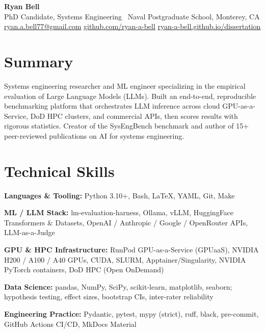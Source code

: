 \documentclass[10pt,letterpaper]{article}
\newcommand{\skillcat}[2]{\textbf{#1:} #2\par}
\begin{document}
\begin{center}
  {\Huge\bfseries\color{npsnavy} Ryan Bell}\\[3pt]
  {\normalsize PhD Candidate, Systems Engineering \textbullet\ Naval Postgraduate School, Monterey, CA}\\[3pt]
  {\small
    \href{mailto:ryan.a.bell77@gmail.com}{ryan.a.bell77@gmail.com} \quad\textbullet\quad
    \href{https://github.com/ryan-a-bell}{github.com/ryan-a-bell} \quad\textbullet\quad
    \href{https://ryan-a-bell.github.io/dissertation/}{ryan-a-bell.github.io/dissertation}
  }
\end{center}

\section{Summary}
Systems engineering researcher and ML engineer specializing in the empirical evaluation of
Large Language Models (LLMs). Built an end-to-end, reproducible benchmarking platform that
orchestrates LLM inference across cloud GPU-as-a-Service, DoD HPC clusters, and commercial
APIs, then scores results with rigorous statistics. Creator of the SysEngBench benchmark and
author of 15+ peer-reviewed publications on AI for systems engineering.

\section{Technical Skills}
\skillcat{Languages \& Tooling}{Python 3.10+, Bash, LaTeX, YAML, Git, Make}
\skillcat{ML / LLM Stack}{lm-evaluation-harness, Ollama, vLLM, HuggingFace Transformers \& Datasets, OpenAI / Anthropic / Google / OpenRouter APIs, LLM-as-a-Judge}
\skillcat{GPU \& HPC Infrastructure}{RunPod GPU-as-a-Service (GPUaaS), NVIDIA H200 / A100 / A40 GPUs, CUDA, SLURM, Apptainer/Singularity, NVIDIA PyTorch containers, DoD HPC (Open OnDemand)}
\skillcat{Data Science}{pandas, NumPy, SciPy, scikit-learn, matplotlib, seaborn; hypothesis testing, effect sizes, bootstrap CIs, inter-rater reliability}
\skillcat{Engineering Practice}{Pydantic, pytest, mypy (strict), ruff, black, pre-commit, GitHub Actions CI/CD, MkDocs Material}

\end{document}
